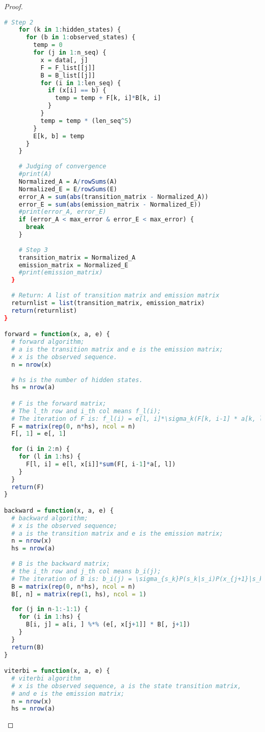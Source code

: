 \documentclass{article}
\begin{document}
\begin{proof}
\begin{lstlisting}[language = {R}]
    # Step 2
    for (k in 1:hidden_states) {
      for (b in 1:observed_states) {
        temp = 0
        for (j in 1:n_seq) {
          x = data[, j]
          F = F_list[[j]]
          B = B_list[[j]]
          for (i in 1:len_seq) {
            if (x[i] == b) {
              temp = temp + F[k, i]*B[k, i]
            }
          }
          temp = temp * (len_seq^5)
        }
        E[k, b] = temp
      }
    }
    
    # Judging of convergence
    #print(A)
    Normalized_A = A/rowSums(A)
    Normalized_E = E/rowSums(E)
    error_A = sum(abs(transition_matrix - Normalized_A))
    error_E = sum(abs(emission_matrix - Normalized_E))
    #print(error_A, error_E)
    if (error_A < max_error & error_E < max_error) {
      break
    }
    
    # Step 3
    transition_matrix = Normalized_A
    emission_matrix = Normalized_E
    #print(emission_matrix)
  }
  
  # Return: A list of transition matrix and emission matrix
  returnlist = list(transition_matrix, emission_matrix)
  return(returnlist)
}

forward = function(x, a, e) {
  # forward algorithm;
  # a is the transition matrix and e is the emission matrix;
  # x is the observed sequence.
  n = nrow(x)
  
  # hs is the number of hidden states.
  hs = nrow(a)

  # F is the forward matrix;
  # The l_th row and i_th col means f_l(i);
  # The iteration of F is: f_l(i) = e[l, i]*\sigma_k(F[k, i-1] * a[k, l])
  F = matrix(rep(0, n*hs), ncol = n)
  F[, 1] = e[, 1]
  
  for (i in 2:n) {
    for (l in 1:hs) {
      F[l, i] = e[l, x[i]]*sum(F[, i-1]*a[, l])
    }
  }
  return(F)
}

backward = function(x, a, e) {
  # backward algorithm;
  # x is the observed sequence;
  # a is the transition matrix and e is the emission matrix;
  n = nrow(x)
  hs = nrow(a)
  
  # B is the backward matrix;
  # the i_th row and j_th col means b_i(j);
  # The iteration of B is: b_i(j) = \sigma_{s_k}P(s_k|s_i)P(x_{j+1}|s_k)b_k(j+1)
  B = matrix(rep(0, n*hs), ncol = n)
  B[, n] = matrix(rep(1, hs), ncol = 1)
  
  for (j in n-1:-1:1) {
    for (i in 1:hs) {
      B[i, j] = a[i, ] %*% (e[, x[j+1]] * B[, j+1])
    }
  }
  return(B)
}

viterbi = function(x, a, e) {
  # viterbi algorithm
  # x is the observed sequence, a is the state transition matrix,
  # and e is the emission matrix;
  n = nrow(x)
  hs = nrow(a)


\end{lstlisting}
\end{proof}
\end{document}
